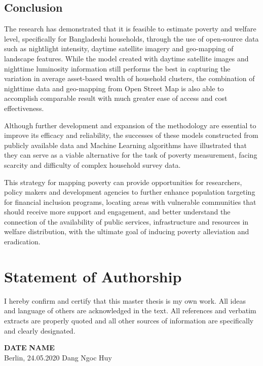\documentclass[solid,math,chem,code,plot,gloss]{bmc}
\begin{document}
\section{Conclusion}

The research has demonstrated that it is feasible to estimate poverty and welfare level, specifically for Bangladeshi households, through the use of open-source data such as nightlight intensity, daytime satellite imagery and geo-mapping of landscape features. While the model created with daytime satellite images and nighttime luminosity information still performs the best in capturing the variation in average asset-based wealth of household clusters, the combination of nighttime data and geo-mapping from Open Street Map is also able to accomplish comparable result with much greater ease of access and cost effectiveness. 

Although further development and expansion of the methodology are essential to improve its efficacy and reliability, the successes of these models constructed from publicly available data and Machine Learning algorithms have illustrated that they can serve as a viable alternative for the task of poverty measurement, facing scarcity and difficulty of complex household survey data. 

This strategy for mapping poverty can provide opportunities for researchers, policy makers and development agencies to further enhance population targeting for financial inclusion programs, locating areas with vulnerable communities that should receive more support and engagement, and better understand the connection of the availability of public services, infrastructure and resources in welfare distribution, with the ultimate goal of inducing poverty alleviation and eradication. 

% 

\printbibliography

\chapter{Statement of Authorship}

I hereby confirm and certify that this master thesis is my own work. All ideas and language of others are acknowledged in the text. All references and verbatim extracts are properly quoted and all other sources of information are specifically and clearly designated. \newline \newline

\textbf{{DATE}}
\hfill
\textbf{NAME} \\
Berlin, 24.05.2020
\hfill
Dang Ngoc Huy
\end{document}

